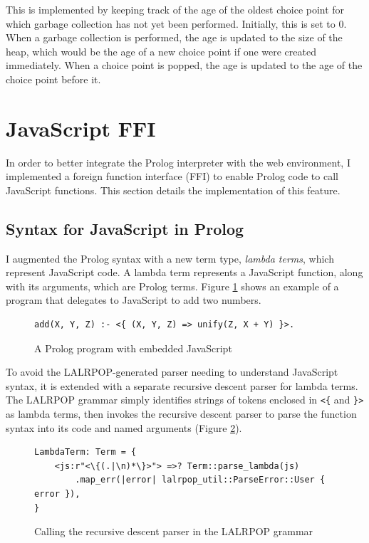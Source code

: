 This is implemented by keeping track of the age of the oldest choice point for which garbage collection has not yet been performed. Initially, this is set to 0. When a garbage collection is performed, the age is updated to the size of the heap, which would be the age of a new choice point if one were created immediately. When a choice point is popped, the age is updated to the age of the choice point before it.

\section{JavaScript FFI}

\label{sec:js-ffi}

In order to better integrate the Prolog interpreter with the web environment, I implemented a foreign function interface (FFI) to enable Prolog code to call JavaScript functions. This section details the implementation of this feature.

\subsection{Syntax for JavaScript in Prolog}

I augmented the Prolog syntax with a new term type, \emph{lambda terms}, which represent JavaScript code. A lambda term represents a JavaScript function, along with its arguments, which are Prolog terms. Figure \ref{fig:js-in-prolog} shows an example of a program that delegates to JavaScript to add two numbers.

\begin{figure}[H]
\centering
\begin{verbatim}
add(X, Y, Z) :- <{ (X, Y, Z) => unify(Z, X + Y) }>.
\end{verbatim}
\caption{A Prolog program with embedded JavaScript}
\label{fig:js-in-prolog}
\end{figure}

To avoid the LALRPOP-generated parser needing to understand JavaScript syntax, it is extended with a separate recursive descent parser for lambda terms. The LALRPOP grammar simply identifies strings of tokens enclosed in \texttt{<\{} and \texttt{\}>} as lambda terms, then invokes the recursive descent parser to parse the function syntax into its code and named arguments (Figure \ref{fig:js-grammar}).

\begin{figure}[H]
\centering
\begin{verbatim}
LambdaTerm: Term = {
    <js:r"<\{(.|\n)*\}>"> =>? Term::parse_lambda(js)
        .map_err(|error| lalrpop_util::ParseError::User { error }),
}
\end{verbatim}
\caption{Calling the recursive descent parser in the LALRPOP grammar}
\label{fig:js-grammar}
\end{figure}

